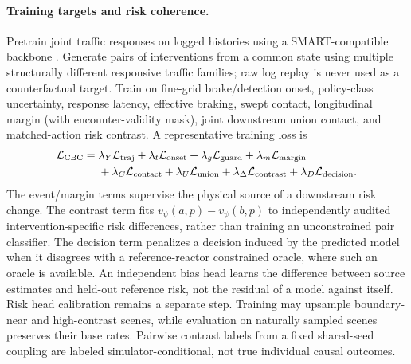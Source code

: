 \documentclass[10pt]{article}
\begin{document}
\paragraph{Training targets and risk coherence.}
Pretrain joint traffic responses on logged histories using a SMART-compatible backbone \parencite{wu2024smart}. Generate pairs of interventions from a common state using multiple structurally different responsive traffic families; raw log replay is never used as a counterfactual target. Train on fine-grid brake/detection onset, policy-class uncertainty, response latency, effective braking, swept contact, longitudinal margin (with encounter-validity mask), joint downstream union contact, and matched-action risk contrast. A representative training loss is
\begin{align}
 \mathcal L_{\rm CBC}={}&\lambda_Y\mathcal L_{\rm traj}+\lambda_t\mathcal L_{\rm onset}
 +\lambda_g\mathcal L_{\rm guard}+\lambda_m\mathcal L_{\rm margin}\nonumber\\
 &+\lambda_C\mathcal L_{\rm contact}+\lambda_U\mathcal L_{\rm union}
 +\lambda_\Delta\mathcal L_{\rm contrast}
 +\lambda_D\mathcal L_{\rm decision}.
 \label{eq:cbcloss}
\end{align}
The event/margin terms supervise the physical source of a downstream risk change. The contrast term fits $v_\psi(a,p)-v_\psi(b,p)$ to independently audited intervention-specific risk differences, rather than training an unconstrained pair classifier. The decision term penalizes a decision induced by the predicted model when it disagrees with a reference-reactor constrained oracle, where such an oracle is available. An independent bias head learns the difference between source estimates and held-out reference risk, not the residual of a model against itself. Risk head calibration remains a separate step. Training may upsample boundary-near and high-contrast scenes, while evaluation on naturally sampled scenes preserves their base rates. Pairwise contrast labels from a fixed shared-seed coupling are labeled simulator-conditional, not true individual causal outcomes.
\end{document}
